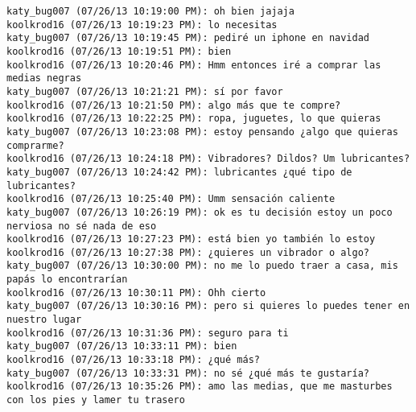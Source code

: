 \begin{verbatim}
katy_bug007 (07/26/13 10:19:00 PM): oh bien jajaja
koolkrod16 (07/26/13 10:19:23 PM): lo necesitas
katy_bug007 (07/26/13 10:19:45 PM): pediré un iphone en navidad
koolkrod16 (07/26/13 10:19:51 PM): bien
koolkrod16 (07/26/13 10:20:46 PM): Hmm entonces iré a comprar las medias negras
katy_bug007 (07/26/13 10:21:21 PM): sí por favor
koolkrod16 (07/26/13 10:21:50 PM): algo más que te compre?
koolkrod16 (07/26/13 10:22:25 PM): ropa, juguetes, lo que quieras
katy_bug007 (07/26/13 10:23:08 PM): estoy pensando ¿algo que quieras comprarme?
koolkrod16 (07/26/13 10:24:18 PM): Vibradores? Dildos? Um lubricantes?
katy_bug007 (07/26/13 10:24:42 PM): lubricantes ¿qué tipo de lubricantes?
koolkrod16 (07/26/13 10:25:40 PM): Umm sensación caliente
katy_bug007 (07/26/13 10:26:19 PM): ok es tu decisión estoy un poco nerviosa no sé nada de eso
koolkrod16 (07/26/13 10:27:23 PM): está bien yo también lo estoy
koolkrod16 (07/26/13 10:27:38 PM): ¿quieres un vibrador o algo?
katy_bug007 (07/26/13 10:30:00 PM): no me lo puedo traer a casa, mis papás lo encontrarían
koolkrod16 (07/26/13 10:30:11 PM): Ohh cierto
katy_bug007 (07/26/13 10:30:16 PM): pero si quieres lo puedes tener en nuestro lugar
koolkrod16 (07/26/13 10:31:36 PM): seguro para ti
katy_bug007 (07/26/13 10:33:11 PM): bien
koolkrod16 (07/26/13 10:33:18 PM): ¿qué más? 
katy_bug007 (07/26/13 10:33:31 PM): no sé ¿qué más te gustaría?
koolkrod16 (07/26/13 10:35:26 PM): amo las medias, que me masturbes con los pies y lamer tu trasero
\end{verbatim}









